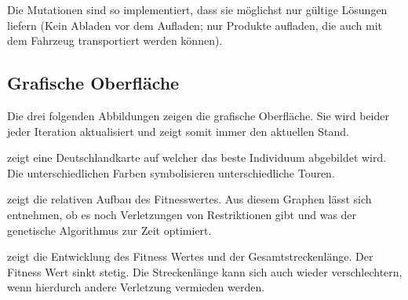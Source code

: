 Die Mutationen sind so implementiert, dass sie möglichst nur gültige Lösungen liefern (Kein Abladen vor dem Aufladen; nur Produkte aufladen, die auch mit dem Fahrzeug transportiert werden können). 



\newpage
\subsection{Grafische Oberfläche}
\label{sec:GrafischeOberflaeche}
Die drei folgenden Abbildungen zeigen die grafische Oberfläche. Sie wird beider jeder Iteration aktualisiert und zeigt somit immer den aktuellen Stand.

 zeigt eine Deutschlandkarte auf welcher das beste Individuum abgebildet wird. Die unterschiedlichen Farben symbolisieren unterschiedliche Touren.

 zeigt die relativen Aufbau des Fitnesswertes. Aus diesem Graphen lässt sich entnehmen, ob es noch Verletzungen von Restriktionen gibt und was der genetische Algorithmus zur Zeit optimiert.

 zeigt die Entwicklung des Fitness Wertes und der Gesamtstreckenlänge. Der Fitness Wert sinkt stetig. Die Streckenlänge kann sich auch wieder verschlechtern, wenn hierdurch andere Verletzung vermieden werden.



